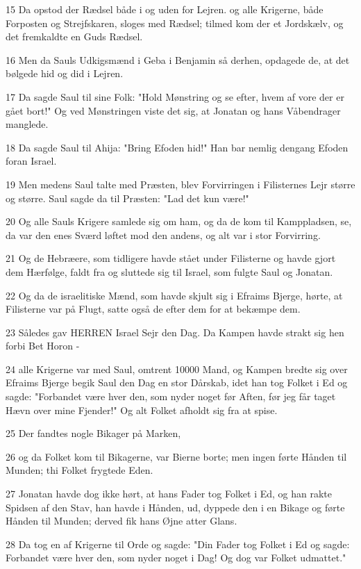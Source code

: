 \par 15 Da opstod der Rædsel både i og uden for Lejren. og alle Krigerne, både Forposten og Strejfskaren, sloges med Rædsel; tilmed kom der et Jordskælv, og det fremkaldte en Guds Rædsel.
\par 16 Men da Sauls Udkigsmænd i Geba i Benjamin så derhen, opdagede de, at det bølgede hid og did i Lejren.
\par 17 Da sagde Saul til sine Folk: "Hold Mønstring og se efter, hvem af vore der er gået bort!" Og ved Mønstringen viste det sig, at Jonatan og hans Våbendrager manglede.
\par 18 Da sagde Saul til Ahija: "Bring Efoden hid!" Han bar nemlig dengang Efoden foran Israel.
\par 19 Men medens Saul talte med Præsten, blev Forvirringen i Filisternes Lejr større og større. Saul sagde da til Præsten: "Lad det kun være!"
\par 20 Og alle Sauls Krigere samlede sig om ham, og da de kom til Kamppladsen, se, da var den enes Sværd løftet mod den andens, og alt var i stor Forvirring.
\par 21 Og de Hebræere, som tidligere havde stået under Filisterne og havde gjort dem Hærfølge, faldt fra og sluttede sig til Israel, som fulgte Saul og Jonatan.
\par 22 Og da de israelitiske Mænd, som havde skjult sig i Efraims Bjerge, hørte, at Filisterne var på Flugt, satte også de efter dem for at bekæmpe dem.
\par 23 Således gav HERREN Israel Sejr den Dag. Da Kampen havde strakt sig hen forbi Bet Horon -
\par 24 alle Krigerne var med Saul, omtrent 10000 Mand, og Kampen bredte sig over Efraims Bjerge begik Saul den Dag en stor Dårskab, idet han tog Folket i Ed og sagde: "Forbandet være hver den, som nyder noget før Aften, før jeg får taget Hævn over mine Fjender!" Og alt Folket afholdt sig fra at spise.
\par 25 Der fandtes nogle Bikager på Marken,
\par 26 og da Folket kom til Bikagerne, var Bierne borte; men ingen førte Hånden til Munden; thi Folket frygtede Eden.
\par 27 Jonatan havde dog ikke hørt, at hans Fader tog Folket i Ed, og han rakte Spidsen af den Stav, han havde i Hånden, ud, dyppede den i en Bikage og førte Hånden til Munden; derved fik hans Øjne atter Glans.
\par 28 Da tog en af Krigerne til Orde og sagde: "Din Fader tog Folket i Ed og sagde: Forbandet være hver den, som nyder noget i Dag! Og dog var Folket udmattet."
